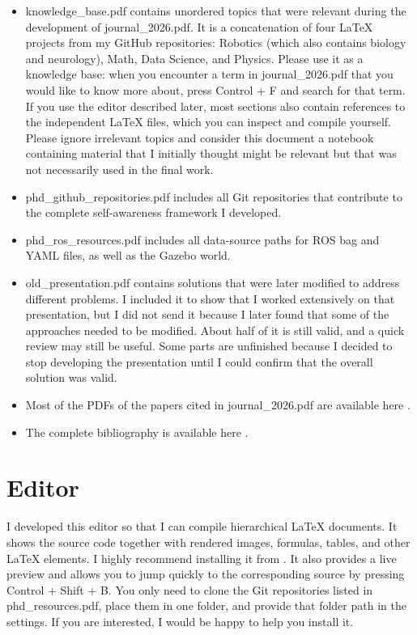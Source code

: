 \documentclass[a4paper]{article}
\begin{document}
\begin{itemize}
\begin{itemize}
         \end{itemize}
         \item knowledge\_base.pdf contains unordered topics that were relevant during the development of journal\_2026.pdf. It is a concatenation of four LaTeX projects from my GitHub repositories: Robotics (which also contains biology and neurology), Math, Data Science, and Physics. Please use it as a knowledge base: when you encounter a term in journal\_2026.pdf that you would like to know more about, press Control + F and search for that term. If you use the editor described later, most sections also contain references to the independent LaTeX files, which you can inspect and compile yourself. Please ignore irrelevant topics and consider this document a notebook containing material that I initially thought might be relevant but that was not necessarily used in the final work.
         \item phd\_github\_repositories.pdf includes all Git repositories that contribute to the complete self-awareness framework I developed.
         \item phd\_ros\_resources.pdf includes all data-source paths for ROS bag and YAML files, as well as the Gazebo world.
         \item old\_presentation.pdf contains solutions that were later modified to address different problems. I included it to show that I worked extensively on that presentation, but I did not send it because I later found that some of the approaches needed to be modified. About half of it is still valid, and a quick review may still be useful. Some parts are unfinished because I decided to stop developing the presentation until I could confirm that the overall solution was valid.
         \item Most of the PDFs of the papers cited in journal\_2026.pdf are available here .
         \item The complete bibliography is available here .
         
      \end{itemize}

   \section{Editor}
      I developed this editor so that I can compile hierarchical LaTeX documents. It shows the source code together with rendered images, formulas, tables, and other LaTeX elements. I highly recommend installing it from . It also provides a live preview and allows you to jump quickly to the corresponding source by pressing Control + Shift + B. You only need to clone the Git repositories listed in phd\_resources.pdf, place them in one folder, and provide that folder path in the settings. If you are interested, I would be happy to help you install it.
\end{document}
